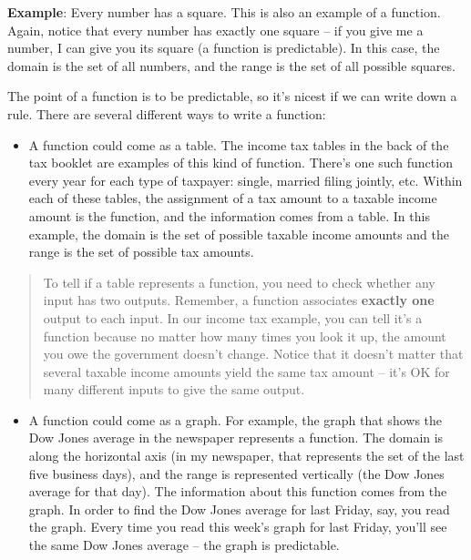 \textbf{Example}: Every number has a square. This is also an example of
a function. Again, notice that every number has exactly one square -- if
you give me a number, I can give you its square (a function is
predictable). In this case, the domain is the set of all numbers, and
the range is the set of all possible squares.

The point of a function is to be predictable, so it's nicest if we can
write down a rule. There are several different ways to write a function:

\begin{itemize}
\item
  A function could come as a table. The income tax tables in the back of
  the tax booklet are examples of this kind of function. There's one
  such function every year for each type of taxpayer: single, married
  filing jointly, etc. Within each of these tables, the assignment of a
  tax amount to a taxable income amount is the function, and the
  information comes from a table. In this example, the domain is the set
  of possible taxable income amounts and the range is the set of
  possible tax amounts.
\end{itemize}

\begin{quote}
To tell if a table represents a function, you need to check whether any
input has two outputs. Remember, a function associates \textbf{exactly
one} output to each input. In our income tax example, you can tell it's
a function because no matter how many times you look it up, the amount
you owe the government doesn't change. Notice that it doesn't matter
that several taxable income amounts yield the same tax amount -- it's OK
for many different inputs to give the same output.
\end{quote}

\begin{itemize}
\item
  A function could come as a graph. For example, the graph that shows
  the Dow Jones average in the newspaper represents a function. The
  domain is along the horizontal axis (in my newspaper, that represents
  the set of the last five business days), and the range is represented
  vertically (the Dow Jones average for that day). The information about
  this function comes from the graph. In order to find the Dow Jones
  average for last Friday, say, you read the graph. Every time you read
  this week's graph for last Friday, you'll see the same Dow Jones
  average -- the graph is predictable.
\end{itemize}

